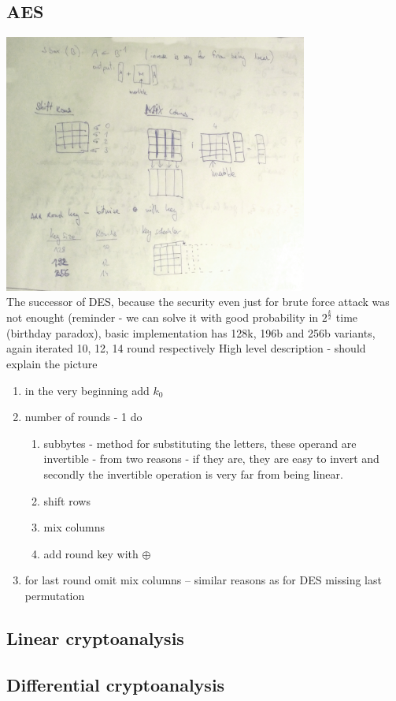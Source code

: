 \documentclass[a4paper,10pt]{article}
\begin{document}
\subsection*{AES}
\includegraphics[width=0.75\textwidth]{AES.jpg}\\
The successor of DES, because the security even just for brute force attack was not enought (reminder - we can solve it with good probability in $2^\frac{k}{2}$ time (birthday paradox), basic implementation has 128k, 196b and 256b variants, again iterated 10, 12, 14 round respectively
High level description - should explain the picture
\begin{enumerate}
\item in the very beginning add $k_0$
\item number of rounds - 1 do
\begin{enumerate}
\item subbytes - method for substituting the letters, these operand are invertible - from two reasons - if they are, they are easy to invert and secondly the invertible operation is very far from being linear.
\item shift rows
\item mix columns
\item add round key with $\oplus$
\end{enumerate}
\item for last round omit mix columns -- similar reasons as for DES missing last permutation
\end{enumerate}
\subsection*{Linear cryptoanalysis}
\subsection*{Differential cryptoanalysis}
\end{document}
